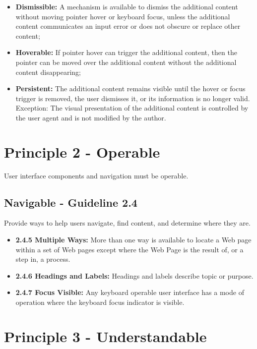 \documentclass[
  letterpaper,
  DIV=11,
  numbers=noendperiod]{scrartcl}
\providecommand{\tightlist}{%
  \setlength{\itemsep}{0pt}\setlength{\parskip}{0pt}}\usepackage{longtable,booktabs,array}
\begin{document}
\begin{itemize}
  \begin{itemize}
  \tightlist
  \item
    \textbf{Dismissible:} A mechanism is available to dismiss the
    additional content without moving pointer hover or keyboard focus,
    unless the additional content communicates an input error or does
    not obscure or replace other content;
  \item
    \textbf{Hoverable:} If pointer hover can trigger the additional
    content, then the pointer can be moved over the additional content
    without the additional content disappearing;
  \item
    \textbf{Persistent:} The additional content remains visible until
    the hover or focus trigger is removed, the user dismisses it, or its
    information is no longer valid. Exception: The visual presentation
    of the additional content is controlled by the user agent and is not
    modified by the author.
  \end{itemize}
\end{itemize}

\section{Principle 2 - Operable}\label{principle-2---operable}

User interface components and navigation must be operable.

\subsection{Navigable - Guideline 2.4}\label{navigable---guideline-2.4}

Provide ways to help users navigate, find content, and determine where
they are.

\begin{itemize}
\tightlist
\item
  \textbf{2.4.5 Multiple Ways:} More than one way is available to locate
  a Web page within a set of Web pages except where the Web Page is the
  result of, or a step in, a process.
\item
  \textbf{2.4.6 Headings and Labels:} Headings and labels describe topic
  or purpose.
\item
  \textbf{2.4.7 Focus Visible:} Any keyboard operable user interface has
  a mode of operation where the keyboard focus indicator is visible.
\end{itemize}

\section{Principle 3 -
Understandable}\label{principle-3---understandable}
\end{document}
